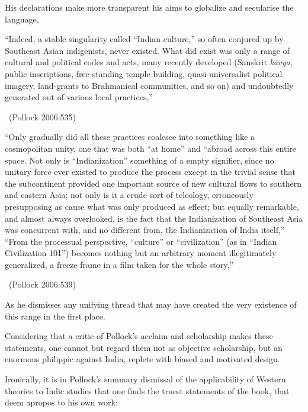 His declarations make more transparent his aims to globalize and secularise the language,

\begin{myquote}
“Indeed, a stable singularity called “Indian culture,” so often conjured up by Southeast Asian indigenists, never existed. What did exist was only a range of cultural and political codes and acts, many recently developed (Sanskrit \textit{kāvya}, public inscriptions, free-standing temple building, quasi-universalist political imagery, land-grants to Brahmanical communities, and so on) and undoubtedly generated out of various local practices,” 

\vskip -5pt

~\hfill (Pollock 2006:535)
\end{myquote}

\begin{myquote}
“Only gradually did all these practices coalesce into something like a cosmopolitan unity, one that was both “at home” and “abroad across this entire space. Not only is “Indianization” something of a empty signifier, since no unitary force ever existed to produce the process except in the trivial sense that the subcontinent provided one important source of new cultural flows to southern and eastern Asia; not only is it a crude sort of teleology, erroneously presupposing as cause what was only produced as effect; but equally remarkable, and almost always overlooked, is the fact that the Indianization of Southeast Asia was concurrent with, and no different from, the Indianization of India itself,” “From the processual perspective, “culture” or “civilization” (as in “Indian Civilization 101”) becomes nothing but an arbitrary moment illegitimately generalized, a freeze frame in a film taken for the whole story,” 

\vskip -5pt

~\hfill (Pollock 2006:539) 
\end{myquote}

As he dismisses any unifying thread that may have created the very existence of this range in the first place.

Considering that a critic of Pollock’s acclaim and scholarship makes these statements, one cannot but regard them not as objective scholarship, but an enormous philippic against India, replete with biased and motivated design.

Ironically, it is in Pollock’s summary dismissal of the applicability of Western theories to Indic studies that one finds the truest statements of the book, that deem apropos to his own work:

